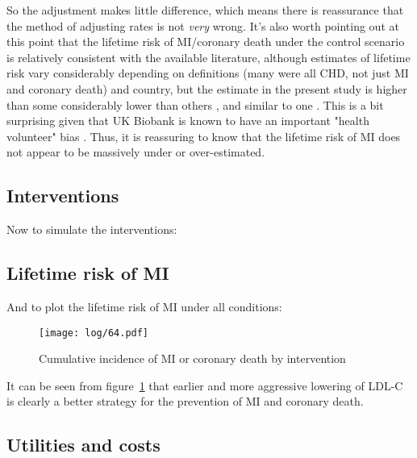 \documentclass[11pt]{article}
\begin{document}
So the adjustment makes little difference, 
which means there is reassurance that the method
of adjusting rates is not \emph{very} wrong. 
It's also worth pointing out at this point that the lifetime risk 
of MI/coronary death under the control scenario is 
relatively consistent with the available literature,
although estimates of lifetime risk vary considerably depending on definitions 
(many were all CHD, not just MI and coronary death)
and country, but the estimate in the present study is higher than some 
\cite{RapsomanikiLancet2014,TurinCirc2010}
considerably lower than others \cite{BerryNEJM2012,LeeningBMJ2014},
and similar to one \cite{StenlingAth2020}. This is a bit surprising given
that UK Biobank is known to have an important "health volunteer" bias \cite{FryAJE2017}.
Thus, it is reassuring to know that the lifetime risk of MI 
does not appear to be massively under or over-estimated.  

\subsection{Interventions}

Now to simulate the interventions:

\color{Blue4}
\begin{stlog}\end{stlog}
\color{black}

\subsection{Lifetime risk of MI}

And to plot the lifetime risk of MI under all conditions:

\color{Blue4}
\begin{stlog}\end{stlog}
\begin{figure}
    \centering
    \texttt{[image: log/64.pdf]}
    \caption{Cumulative incidence of MI or coronary death by intervention}
    \label{cumMIint}
\end{figure}
\begin{stlog}\end{stlog}
\color{black}

It can be seen from figure~\ref{cumMIint} that earlier and more aggressive lowering of LDL-C is
clearly a better strategy for the prevention of MI and coronary death. 

\subsection{Utilities and costs}
\end{document}
